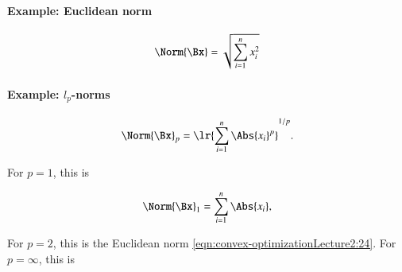 
\paragraph{Example: Euclidean norm}

\begin{equation}\label{eqn:convex-optimizationLecture2:24}
\Norm{\Bx} = \sqrt{ \sum_{i = 1}^n x_i^2 }
\end{equation}

\paragraph{Example: \(l_p\)-norms}

\begin{equation}\label{eqn:convex-optimizationLecture2:44}
\Norm{\Bx}_p = \lr{ \sum_{i = 1}^n \Abs{x_i}^p }^{1/p}.
\end{equation}

For \( p = 1 \), this is

\begin{equation}\label{eqn:convex-optimizationLecture2:64}
\Norm{\Bx}_1 = \sum_{i = 1}^n \Abs{x_i},
\end{equation}

For \( p = 2 \), this is the Euclidean norm \cref{eqn:convex-optimizationLecture2:24}.
For \( p = \infty \), this is

